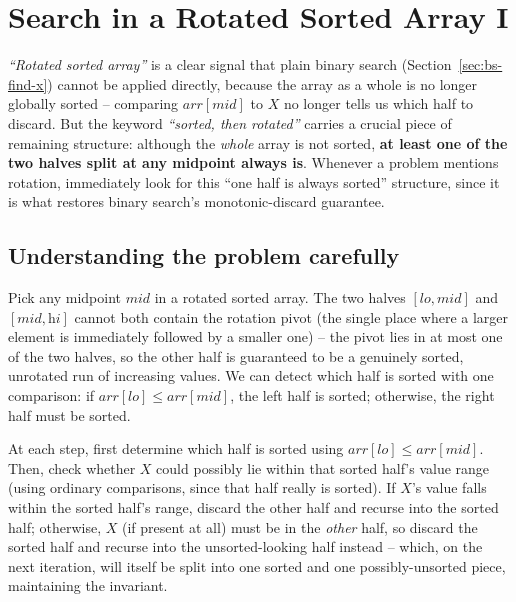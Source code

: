 \section{Search in a Rotated Sorted Array I}
\label{sec:bs-rotated-1}


\begin{patternbox}
\emph{``Rotated sorted array''} is a clear signal that plain binary search
(Section~\ref{sec:bs-find-x}) cannot be applied directly, because the array
as a whole is no longer globally sorted -- comparing
$\textit{arr}[\textit{mid}]$ to $X$ no longer tells us which half to
discard. But the keyword \emph{``sorted, then rotated''} carries a crucial
piece of remaining structure: although the \emph{whole} array is not
sorted, \textbf{at least one of the two halves split at any midpoint always
is}. Whenever a problem mentions rotation, immediately look for this
``one half is always sorted'' structure, since it is what restores binary
search's monotonic-discard guarantee.
\end{patternbox}

\subsection*{Understanding the problem carefully}

Pick any midpoint $\textit{mid}$ in a rotated sorted array. The two halves
$[\textit{lo}, \textit{mid}]$ and $[\textit{mid}, \textit{hi}]$ cannot both
contain the rotation pivot (the single place where a larger element is
immediately followed by a smaller one) -- the pivot lies in at most one of
the two halves, so the other half is guaranteed to be a genuinely sorted,
unrotated run of increasing values. We can detect which half is sorted with
one comparison: if $\textit{arr}[\textit{lo}] \le
\textit{arr}[\textit{mid}]$, the left half is sorted; otherwise, the right
half must be sorted.

\begin{ideabox}
At each step, first determine which half is sorted using
$\textit{arr}[\textit{lo}] \le \textit{arr}[\textit{mid}]$. Then, check
whether $X$ could possibly lie within that sorted half's value range (using
ordinary comparisons, since that half really is sorted). If $X$'s value
falls within the sorted half's range, discard the other half and recurse
into the sorted half; otherwise, $X$ (if present at all) must be in the
\emph{other} half, so discard the sorted half and recurse into the
unsorted-looking half instead -- which, on the next iteration, will itself
be split into one sorted and one possibly-unsorted piece, maintaining the
invariant.
\end{ideabox}

